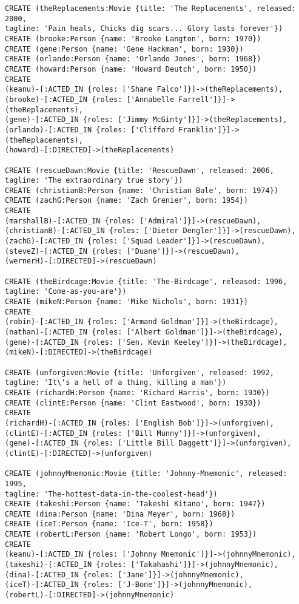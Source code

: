 \begin{lstlisting}
CREATE (theReplacements:Movie {title: 'The Replacements', released: 2000,
tagline: 'Pain heals, Chicks dig scars... Glory lasts forever'})
CREATE (brooke:Person {name: 'Brooke Langton', born: 1970})
CREATE (gene:Person {name: 'Gene Hackman', born: 1930})
CREATE (orlando:Person {name: 'Orlando Jones', born: 1968})
CREATE (howard:Person {name: 'Howard Deutch', born: 1950})
CREATE
(keanu)-[:ACTED_IN {roles: ['Shane Falco']}]->(theReplacements),
(brooke)-[:ACTED_IN {roles: ['Annabelle Farrell']}]->(theReplacements),
(gene)-[:ACTED_IN {roles: ['Jimmy McGinty']}]->(theReplacements),
(orlando)-[:ACTED_IN {roles: ['Clifford Franklin']}]->(theReplacements),
(howard)-[:DIRECTED]->(theReplacements)

CREATE (rescueDawn:Movie {title: 'RescueDawn', released: 2006,
tagline: 'The extraordinary true story'})
CREATE (christianB:Person {name: 'Christian Bale', born: 1974})
CREATE (zachG:Person {name: 'Zach Grenier', born: 1954})
CREATE
(marshallB)-[:ACTED_IN {roles: ['Admiral']}]->(rescueDawn),
(christianB)-[:ACTED_IN {roles: ['Dieter Dengler']}]->(rescueDawn),
(zachG)-[:ACTED_IN {roles: ['Squad Leader']}]->(rescueDawn),
(steveZ)-[:ACTED_IN {roles: ['Duane']}]->(rescueDawn),
(wernerH)-[:DIRECTED]->(rescueDawn)

CREATE (theBirdcage:Movie {title: 'The-Birdcage', released: 1996, tagline: 'Come-as-you-are'})
CREATE (mikeN:Person {name: 'Mike Nichols', born: 1931})
CREATE
(robin)-[:ACTED_IN {roles: ['Armand Goldman']}]->(theBirdcage),
(nathan)-[:ACTED_IN {roles: ['Albert Goldman']}]->(theBirdcage),
(gene)-[:ACTED_IN {roles: ['Sen. Kevin Keeley']}]->(theBirdcage),
(mikeN)-[:DIRECTED]->(theBirdcage)

CREATE (unforgiven:Movie {title: 'Unforgiven', released: 1992,
tagline: 'It\'s a hell of a thing, killing a man'})
CREATE (richardH:Person {name: 'Richard Harris', born: 1930})
CREATE (clintE:Person {name: 'Clint Eastwood', born: 1930})
CREATE
(richardH)-[:ACTED_IN {roles: ['English Bob']}]->(unforgiven),
(clintE)-[:ACTED_IN {roles: ['Bill Munny']}]->(unforgiven),
(gene)-[:ACTED_IN {roles: ['Little Bill Daggett']}]->(unforgiven),
(clintE)-[:DIRECTED]->(unforgiven)

CREATE (johnnyMnemonic:Movie {title: 'Johnny-Mnemonic', released: 1995,
tagline: 'The-hottest-data-in-the-coolest-head'})
CREATE (takeshi:Person {name: 'Takeshi Kitano', born: 1947})
CREATE (dina:Person {name: 'Dina Meyer', born: 1968})
CREATE (iceT:Person {name: 'Ice-T', born: 1958})
CREATE (robertL:Person {name: 'Robert Longo', born: 1953})
CREATE
(keanu)-[:ACTED_IN {roles: ['Johnny Mnemonic']}]->(johnnyMnemonic),
(takeshi)-[:ACTED_IN {roles: ['Takahashi']}]->(johnnyMnemonic),
(dina)-[:ACTED_IN {roles: ['Jane']}]->(johnnyMnemonic),
(iceT)-[:ACTED_IN {roles: ['J-Bone']}]->(johnnyMnemonic),
(robertL)-[:DIRECTED]->(johnnyMnemonic)


\end{lstlisting}

